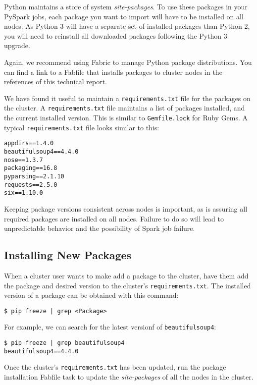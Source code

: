 \documentclass[9pt,twocolumn,twoside]{idsi}
\begin{document}
Python maintains a store of system \emph{site-packages}. To use these packages in your PySpark jobs, each package you want to import will have to be installed on all nodes. As Python 3 will have a separate set of installed packages than Python 2, you will need to reinstall all downloaded packages following the Python 3 upgrade.

Again, we recommend using Fabric to manage Python package distributions. You can find a link to a Fabfile that installs packages to cluster nodes in the references of this technical report.

We have found it useful to maintain a \texttt{requirements.txt} file for the packages on the cluster. A \texttt{requirements.txt} file maintains a list of packages installed, and the current installed version. This is similar to \texttt{Gemfile.lock} for Ruby Gems. A typical \texttt{requirements.txt} file looks similar to this:

\begin{verbatim}
appdirs==1.4.0
beautifulsoup4==4.4.0
nose==1.3.7
packaging==16.8
pyparsing==2.1.10
requests==2.5.0
six==1.10.0
\end{verbatim}

Keeping package versions consistent across nodes is important, as is assuring all required packages are installed on all nodes. Failure to do so will lead to unpredictable behavior and the possibility of Spark job failure.

\subsection{Installing New Packages}

When a cluster user wants to make add a package to the cluster, have them add the package and desired version to the cluster's \texttt{requirements.txt}. The installed version of a package can be obtained with this command:
\begin{verbatim}
$ pip freeze | grep <Package>
\end{verbatim}

For example, we can search for the latest versionf of \texttt{beautifulsoup4}:
\begin{verbatim}
$ pip freeze | grep beautifulsoup4
beautifulsoup4==4.4.0
\end{verbatim}

Once the cluster's \texttt{requirements.txt} has been updated, run the package installation Fabfile task to update the \emph{site-packages} of all the nodes in the cluster.
\end{document}
